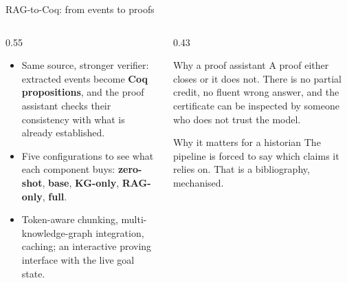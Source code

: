 \documentclass[aspectratio=169, 10pt]{beamer}
\begin{document}
\begin{frame}{RAG-to-Coq: from events to proofs}
  \begin{columns}[T]
    \begin{column}{0.55\textwidth}
      \begin{itemize}
        \item Same source, stronger verifier: extracted events become \textbf{Coq propositions}, and the proof assistant checks their consistency with what is already established.
        \item Five configurations to see what each component buys: \textbf{zero-shot}, \textbf{base}, \textbf{KG-only}, \textbf{RAG-only}, \textbf{full}.
        \item Token-aware chunking, multi-knowledge-graph integration, caching; an interactive proving interface with the live goal state.
      \end{itemize}
    \end{column}
    \begin{column}{0.43\textwidth}
      \begin{block}{Why a proof assistant}
        A proof either closes or it does not. There is no partial credit, no fluent wrong answer, and the certificate can be inspected by someone who does not trust the model.
      \end{block}
      \begin{block}{Why it matters for a historian}
        The pipeline is forced to say which claims it relies on. That is a bibliography, mechanised.
      \end{block}
    \end{column}
  \end{columns}
\end{frame}
\end{document}
